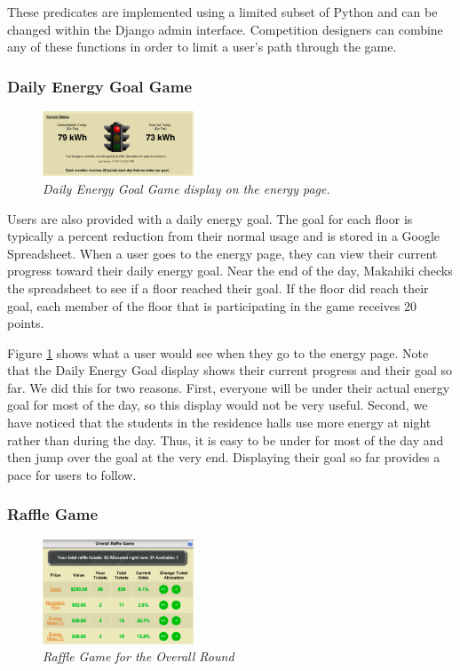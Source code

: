 \documentclass{acm_proc_article-sp}
\begin{document}
These predicates are implemented using a limited subset of Python and can be changed within the Django admin interface. Competition designers can combine any of these functions in order to limit a user's path through the game.

\subsubsection{Daily Energy Goal Game}

\begin{figure}[t!]
  \center
  \includegraphics[width=0.4\textwidth]{daily-energy-goal-game.eps}
  \caption{\em \small Daily Energy Goal Game display on the energy page.}
  \label{fig:DailyEnergyGoal}
\end{figure}

Users are also provided with a daily energy goal. The goal for each floor is typically a percent reduction from their normal usage and is stored in a Google Spreadsheet. When a user goes to the energy page, they can view their current progress toward their daily energy goal. Near the end of the day, Makahiki checks the spreadsheet to see if a floor reached their goal. If the floor did reach their goal, each member of the floor that is participating in the game receives 20 points. 

Figure \ref{fig:DailyEnergyGoal} shows what a user would see when they go to the energy page. Note that the Daily Energy Goal display shows their current progress and their goal so far. We did this for two reasons. First, everyone will be under their actual energy goal for most of the day, so this display would not be very useful. Second, we have noticed that the students in the residence halls use more energy at night rather than during the day. Thus, it is easy to be under for most of the day and then jump over the goal at the very end. Displaying their goal so far provides a pace for users to follow. 

\subsubsection{Raffle Game}

\begin{figure}[t!]
  \center
  \includegraphics[width=0.4\textwidth]{raffle-small.eps}
  \caption{\em \small Raffle Game for the Overall Round}
  \label{fig:RaffleGame}
\end{figure}
\end{document}
